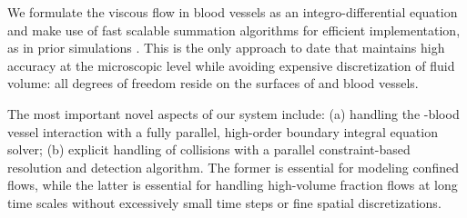 We formulate the viscous flow in blood vessels as an integro-differential equation and make use of fast scalable summation algorithms for efficient implementation, as in prior \rbc simulations \cite{Veerapaneni2011}. 
This is the only approach to date that maintains high accuracy at the microscopic level while avoiding expensive discretization of fluid volume: all degrees of freedom reside on the surfaces of \rbcs and blood vessels.


The most important novel aspects of our system include:
(a) handling the \rbc-blood vessel interaction with a fully parallel, high-order
boundary integral equation solver;
(b) explicit handling of collisions with a parallel constraint-based resolution and detection algorithm.
The former is essential for modeling confined flows, while the latter is essential for handling high-volume fraction flows at long time scales without excessively small time steps or fine spatial discretizations. 

